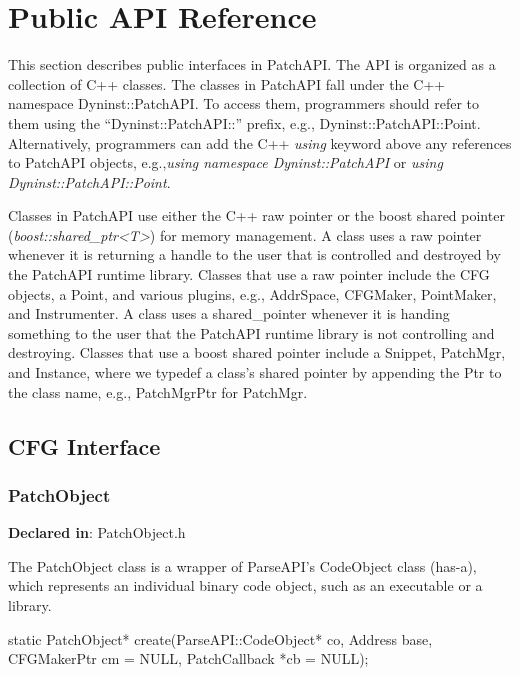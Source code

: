 \section{Public API Reference}
\label{sec-public-api}

This section describes public interfaces in PatchAPI. The API is organized as a
collection of C++ classes. The classes in PatchAPI fall under the C++ namespace
Dyninst::PatchAPI. To access them, programmers should refer to them using the
``Dyninst::PatchAPI::'' prefix, e.g., Dyninst::PatchAPI::Point. Alternatively,
programmers can add the C++ \emph{using} keyword above any references to
PatchAPI objects, e.g.,\emph{using namespace Dyninst::PatchAPI} or \emph{using
  Dyninst::PatchAPI::Point}.

Classes in PatchAPI use either the C++ raw pointer or the boost shared pointer
(\emph{boost::shared\_ptr<T>}) for memory management. A class uses a raw pointer
whenever it is returning a handle to the user that is controlled and destroyed
by the PatchAPI runtime library. Classes that use a raw pointer include the CFG
objects, a Point, and various plugins, e.g., AddrSpace, CFGMaker, PointMaker,
and Instrumenter.  A class uses a shared\_pointer whenever it is handing
something to the user that the PatchAPI runtime library is not controlling and
destroying. Classes that use a boost shared pointer include a Snippet, PatchMgr,
and Instance, where we typedef a class's shared pointer by appending the Ptr to
the class name, e.g., PatchMgrPtr for PatchMgr.

\subsection{CFG Interface}

\subsubsection{PatchObject}
\label{sec-3.2.8}

\textbf{Declared in}: PatchObject.h

The PatchObject class is a wrapper of ParseAPI's CodeObject class (has-a), which
represents an individual binary code object, such as an executable or a library.


\begin{apient}
static PatchObject* create(ParseAPI::CodeObject* co, Address base,
                           CFGMakerPtr cm = NULL, PatchCallback *cb = NULL);
\end{apient}


